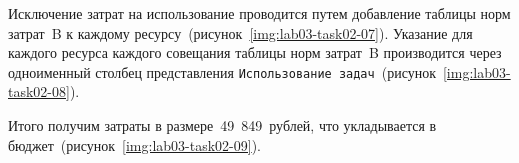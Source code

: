 Исключение затрат на использование проводится путем добавление таблицы норм
затрат~B к каждому ресурсу~(рисунок~\ref{img:lab03-task02-07}). Указание для
каждого ресурса каждого совещания таблицы норм затрат~B производится через
одноименный столбец представления \texttt{Использование
задач}~(рисунок~\ref{img:lab03-task02-08}).



Итого получим затраты в размере~49~849~рублей, что укладывается в
бюджет~(рисунок~\ref{img:lab03-task02-09}).

